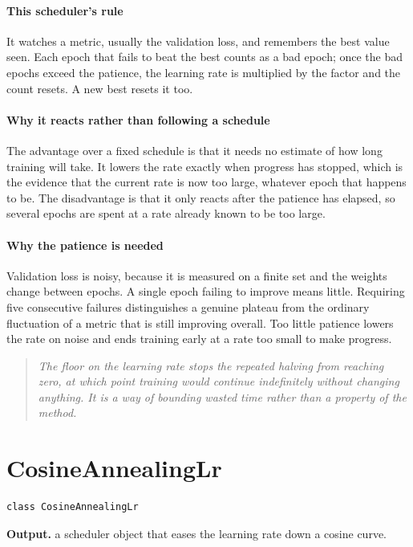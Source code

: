\paragraph{This scheduler's rule}
It watches a metric, usually the validation loss, and remembers the best value seen. Each epoch that fails to beat the best counts as a bad epoch; once the bad epochs exceed the patience, the learning rate is multiplied by the factor and the count resets. A new best resets it too.


\paragraph{Why it reacts rather than following a schedule}
The advantage over a fixed schedule is that it needs no estimate of how long training will take. It lowers the rate exactly when progress has stopped, which is the evidence that the current rate is now too large, whatever epoch that happens to be. The disadvantage is that it only reacts after the patience has elapsed, so several epochs are spent at a rate already known to be too large.


\paragraph{Why the patience is needed}
Validation loss is noisy, because it is measured on a finite set and the weights change between epochs. A single epoch failing to improve means little. Requiring five consecutive failures distinguishes a genuine plateau from the ordinary fluctuation of a metric that is still improving overall. Too little patience lowers the rate on noise and ends training early at a rate too small to make progress.


\begin{quote}\small\itshape The floor on the learning rate stops the repeated halving from reaching zero, at which point training would continue indefinitely without changing anything. It is a way of bounding wasted time rather than a property of the method.\end{quote}

\section{CosineAnnealingLr}
\begin{lstlisting}[style=sig]
class CosineAnnealingLr
\end{lstlisting}

\noindent\textbf{Output.} a scheduler object that eases the learning rate down a cosine curve.


